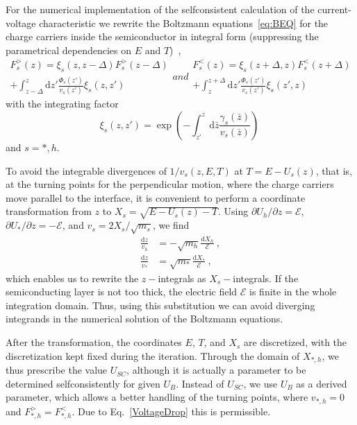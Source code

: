 \documentclass[pre,reprint,floats]{revtex4-1}
\newcommand{\rmd}{\ensuremath{\mathrm{d}}}
\begin{document}
For the numerical implementation of the selfconsistent calculation of the current-voltage characteristic
we rewrite the Boltzmann equations~\eqref{eq:BEQ} for the charge carriers inside the semiconductor  
in integral form (suppressing the parametrical dependencies on $E$ and $T$)~\cite{RBF20}, 
\begin{subequations}\label{eq:sol_it}
\begin{multline}\label{eq:sol>it}
F_s^{>}(z) = \xi_s(z,z-\Delta) F_s^>(z-\Delta)\\
 + \int_{z-\Delta}^{z} \mathrm{d} z' \frac{\Phi_s(z')}{v_s(z')} \xi_s(z,z')
\end{multline}
and
\begin{multline}\label{eq:sol<it}
F_s^{<}(z) = \xi_s(z +\Delta,  z) F_s^<(z + \Delta) \\
+ \int_{z}^{z + \Delta}   
\mathrm{d} z'\frac{\Phi_s(z')}{v_s(z')} \xi_s(z',z)
\end{multline}
\end{subequations}
\noindent with the integrating factor 
\begin{equation}\label{eq:I}
\xi_s(z,z') = \exp\left( -\int_{z'}^{z} \mathrm{d} \bar z\frac{\gamma_s(\bar z)}{v_s(\bar z)} \right)~
\end{equation}
and $s=*,h$.

To avoid the integrable divergences of $1/v_s(z,E,T)$ at $T=E-U_s(z)$, that is, at the turning points
for the perpendicular motion, where the charge carriers move parallel to the interface, it is 
convenient to perform a coordinate transformation from $z$ to \mbox{$X_s = \sqrt{E-U_s(z)-T}$}. Using 
\mbox{$\partial U_h/\partial z =\mathcal{E}$},\mbox{ $\partial U_*/\partial z =-\mathcal{E}$}, and 
$v_s = 2X_s/\sqrt{m_s}$, we find
\begin{subequations}
\label{eq:substitution}
\begin{align}
\frac{\rmd z}{v_h} &= -\sqrt{m_h} \frac{\rmd X_h}{\mathcal{E}}~,\\
\frac{\rmd z}{v_*} &= \sqrt{m_*} \frac{\rmd X_*}{\mathcal{E}}~,
\end{align}
\end{subequations}
\noindent which enables us to rewrite the $z-$integrals as $X_s-$integrals. If the semiconducting layer 
is not too thick, the electric field $\mathcal{E}$ is finite in the whole integration domain. Thus, 
using this substitution we can avoid diverging integrands in the numerical solution of the Boltzmann 
equations. 
	
After the transformation, the coordinates $E$, $T$, and $X_s$ are discretized, with the discretization 
kept fixed during the iteration. Through the domain of $X_{*,h}$, we thus prescribe the value $U_{SC}$, 
although it is actually a parameter to be determined selfconsistently for given $U_B$. Instead of 
$U_{SC}$, we use $U_B$ as a derived parameter, which allows a better handling of the turning points, 
where $v_{*,h}=0$ and $F_{*,h}^>=F_{*,h}^<$. Due to Eq.~\eqref{VoltageDrop} this is permissible.
\end{document}
